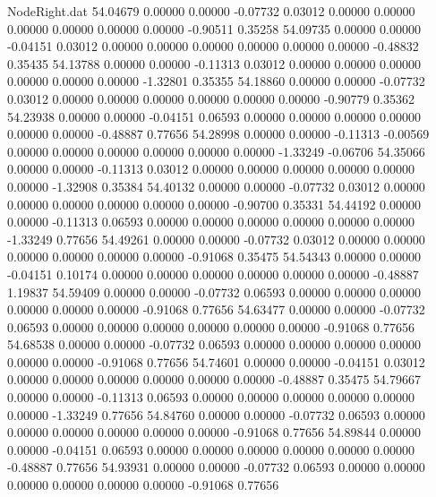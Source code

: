 \begin{filecontents}{NodeRight.dat}
  54.04679    0.00000    0.00000    -0.07732    0.03012    0.00000    0.00000    0.00000    0.00000    0.00000    0.00000   -0.90511    0.35258
  54.09735    0.00000    0.00000    -0.04151    0.03012    0.00000    0.00000    0.00000    0.00000    0.00000    0.00000   -0.48832    0.35435
  54.13788    0.00000    0.00000    -0.11313    0.03012    0.00000    0.00000    0.00000    0.00000    0.00000    0.00000   -1.32801    0.35355
  54.18860    0.00000    0.00000    -0.07732    0.03012    0.00000    0.00000    0.00000    0.00000    0.00000    0.00000   -0.90779    0.35362
  54.23938    0.00000    0.00000    -0.04151    0.06593    0.00000    0.00000    0.00000    0.00000    0.00000    0.00000   -0.48887    0.77656
  54.28998    0.00000    0.00000    -0.11313   -0.00569    0.00000    0.00000    0.00000    0.00000    0.00000    0.00000   -1.33249   -0.06706
  54.35066    0.00000    0.00000    -0.11313    0.03012    0.00000    0.00000    0.00000    0.00000    0.00000    0.00000   -1.32908    0.35384
  54.40132    0.00000    0.00000    -0.07732    0.03012    0.00000    0.00000    0.00000    0.00000    0.00000    0.00000   -0.90700    0.35331
  54.44192    0.00000    0.00000    -0.11313    0.06593    0.00000    0.00000    0.00000    0.00000    0.00000    0.00000   -1.33249    0.77656
  54.49261    0.00000    0.00000    -0.07732    0.03012    0.00000    0.00000    0.00000    0.00000    0.00000    0.00000   -0.91068    0.35475
  54.54343    0.00000    0.00000    -0.04151    0.10174    0.00000    0.00000    0.00000    0.00000    0.00000    0.00000   -0.48887    1.19837
  54.59409    0.00000    0.00000    -0.07732    0.06593    0.00000    0.00000    0.00000    0.00000    0.00000    0.00000   -0.91068    0.77656
  54.63477    0.00000    0.00000    -0.07732    0.06593    0.00000    0.00000    0.00000    0.00000    0.00000    0.00000   -0.91068    0.77656
  54.68538    0.00000    0.00000    -0.07732    0.06593    0.00000    0.00000    0.00000    0.00000    0.00000    0.00000   -0.91068    0.77656
  54.74601    0.00000    0.00000    -0.04151    0.03012    0.00000    0.00000    0.00000    0.00000    0.00000    0.00000   -0.48887    0.35475
  54.79667    0.00000    0.00000    -0.11313    0.06593    0.00000    0.00000    0.00000    0.00000    0.00000    0.00000   -1.33249    0.77656
  54.84760    0.00000    0.00000    -0.07732    0.06593    0.00000    0.00000    0.00000    0.00000    0.00000    0.00000   -0.91068    0.77656
  54.89844    0.00000    0.00000    -0.04151    0.06593    0.00000    0.00000    0.00000    0.00000    0.00000    0.00000   -0.48887    0.77656
  54.93931    0.00000    0.00000    -0.07732    0.06593    0.00000    0.00000    0.00000    0.00000    0.00000    0.00000   -0.91068    0.77656

\end{filecontents}
